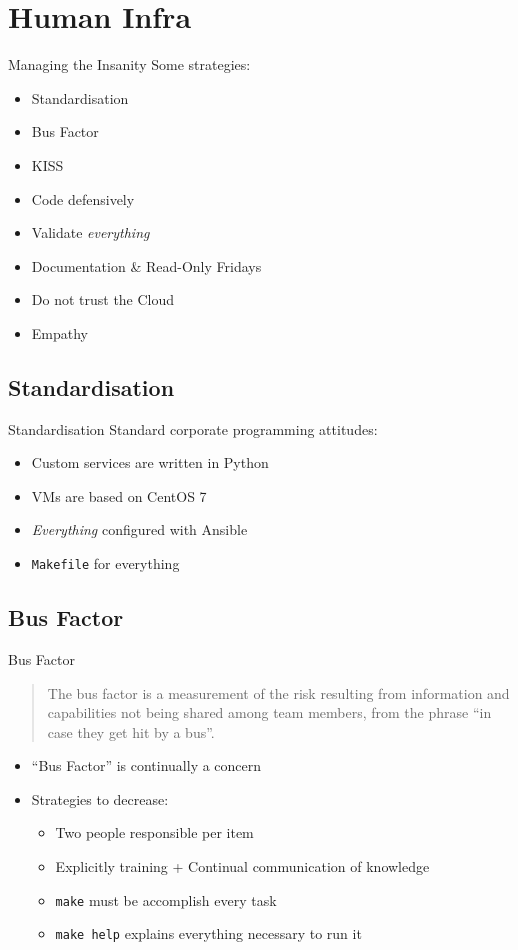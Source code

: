 \documentclass[12pt]{ufrslides}
\begin{document}
\section{Human Infra}
\begin{frame}{Managing the Insanity}
	Some strategies:
	\begin{itemize}
		\item Standardisation
		\item Bus Factor
		\item KISS
		\item Code defensively
		\item Validate \emph{everything}
		\item Documentation \& Read-Only Fridays
		\item Do not trust the Cloud
		\item Empathy
	\end{itemize}
\end{frame}

\subsection{Standardisation}
\begin{frame}{Standardisation}
	Standard corporate programming attitudes:
	\begin{itemize}
		\item Custom services are written in Python
		\item VMs are based on CentOS 7
		\item \emph{Everything} configured with Ansible
		\item \texttt{Makefile} for everything
	\end{itemize}
\end{frame}

\subsection{Bus Factor}
\begin{frame}{Bus Factor}
	\begin{quote}
		The bus factor is a measurement of the risk resulting from information
		and capabilities not being shared among team members, from the phrase
		``in case they get hit by a bus''.\cite{wiki:Bus_factor}
	\end{quote}
	\vfill
	\begin{itemize}
		\item ``Bus Factor'' is continually a concern
		\item Strategies to decrease:
		\begin{itemize}
			\item Two people responsible per item
			\item Explicitly training + Continual communication of knowledge
			\item \texttt{make} must be accomplish every task
			\item \texttt{make help} explains everything necessary to run it
		\end{itemize}
	\end{itemize}
\end{frame}
\end{document}
